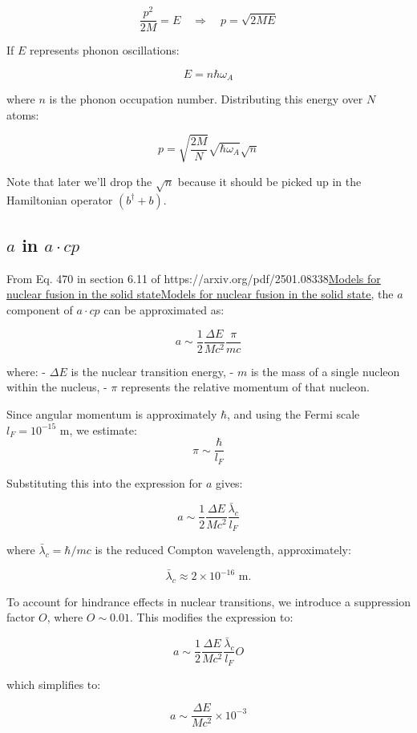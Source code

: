 \documentclass[
]{article}
\let\oldhref\href
\renewcommand{\href}[2]{\ifx#1\urlprefix\oldhref{#1}{#2}\else\uline{\oldhref{#1}{#2}}\fi}
\renewcommand{\[}{\begin{equation}}
\renewcommand{\]}{\end{equation}}
\begin{document}
\[
\frac{p^2}{2M} = E \quad \Rightarrow \quad p = \sqrt{2ME}
\]

If \(E\) represents phonon oscillations:

\[
E = n \hbar \omega_A 
\]

where \(n\) is the phonon occupation number. Distributing this energy
over \(N\) atoms:

\[
p = \sqrt{\frac{2M}{N}} \sqrt{\hbar \omega_A} \sqrt{n} \label{eq:p}
\]

Note that later we'll drop the \(\sqrt{n}\) because it should be picked
up in the Hamiltonian operator \((b^{\dagger} + b)\).

\subsection{\texorpdfstring{\(a\) in
\(a \cdot cp\)}{a in a \textbackslash cdot cp}}\label{a-in-a-cdot-cp}

From Eq. 470 in section 6.11 of
\href{https://arxiv.org/pdf/2501.08338}{Models for nuclear fusion in the
solid state}, the \(a\) component of \(a \cdot cp\) can be approximated
as:

\[
a \sim \frac{1}{2} \frac{\Delta E}{M c^2} \frac{\pi}{m c}
\]

where: - \(\Delta E\) is the nuclear transition energy, - \(m\) is the
mass of a single nucleon within the nucleus, - \(\pi\) represents the
relative momentum of that nucleon.

Since angular momentum is approximately \(\hbar\), and using the Fermi
scale \(l_F = 10^{-15}\) m, we estimate: \[
\pi \sim \frac{\hbar}{l_F} 
\]

Substituting this into the expression for \(a\) gives:

\[
a \sim \frac{1}{2} \frac{\Delta E}{M c^2} \frac{\bar\lambda_c}{l_F} 
\]

where \(\bar\lambda_c = \hbar / m c\) is the reduced Compton wavelength,
approximately:

\[
\bar\lambda_c \approx 2 \times 10^{-16} \text{ m}.
\]

To account for hindrance effects in nuclear transitions, we introduce a
suppression factor \(O\), where \(O \sim 0.01\). This modifies the
expression to:

\[
a \sim \frac{1}{2} \frac{\Delta E}{M c^2} \frac{\bar\lambda_c}{l_F} O 
\]

which simplifies to:

\[
a \sim \frac{\Delta E}{M c^2} \times 10^{-3} 
\label{eq:a}
\]
\end{document}
